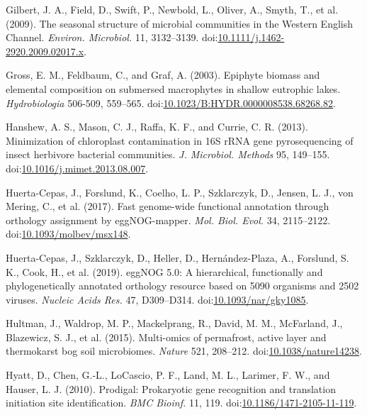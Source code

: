 \documentclass[12pt,]{article}
\begin{document}
\leavevmode\hypertarget{ref-Gilbert2009}{}%
Gilbert, J. A., Field, D., Swift, P., Newbold, L., Oliver, A., Smyth,
T., et al. (2009). The seasonal structure of microbial communities in
the Western English Channel. \emph{Environ. Microbiol.} 11, 3132--3139.
doi:\href{https://doi.org/10.1111/j.1462-2920.2009.02017.x}{10.1111/j.1462-2920.2009.02017.x}.

\leavevmode\hypertarget{ref-Gross2003}{}%
Gross, E. M., Feldbaum, C., and Graf, A. (2003). Epiphyte biomass and
elemental composition on submersed macrophytes in shallow eutrophic
lakes. \emph{Hydrobiologia} 506-509, 559--565.
doi:\href{https://doi.org/10.1023/B:HYDR.0000008538.68268.82}{10.1023/B:HYDR.0000008538.68268.82}.

\leavevmode\hypertarget{ref-Hanshew2013}{}%
Hanshew, A. S., Mason, C. J., Raffa, K. F., and Currie, C. R. (2013).
Minimization of chloroplast contamination in 16S rRNA gene
pyrosequencing of insect herbivore bacterial communities. \emph{J.
Microbiol. Methods} 95, 149--155.
doi:\href{https://doi.org/10.1016/j.mimet.2013.08.007}{10.1016/j.mimet.2013.08.007}.

\leavevmode\hypertarget{ref-Huerta-Cepas2017}{}%
Huerta-Cepas, J., Forslund, K., Coelho, L. P., Szklarczyk, D., Jensen,
L. J., von Mering, C., et al. (2017). Fast genome-wide functional
annotation through orthology assignment by eggNOG-mapper. \emph{Mol.
Biol. Evol.} 34, 2115--2122.
doi:\href{https://doi.org/10.1093/molbev/msx148}{10.1093/molbev/msx148}.

\leavevmode\hypertarget{ref-Huerta-Cepas2019}{}%
Huerta-Cepas, J., Szklarczyk, D., Heller, D., Hernández-Plaza, A.,
Forslund, S. K., Cook, H., et al. (2019). eggNOG 5.0: A hierarchical,
functionally and phylogenetically annotated orthology resource based on
5090 organisms and 2502 viruses. \emph{Nucleic Acids Res.} 47,
D309--D314.
doi:\href{https://doi.org/10.1093/nar/gky1085}{10.1093/nar/gky1085}.

\leavevmode\hypertarget{ref-Hultman2015}{}%
Hultman, J., Waldrop, M. P., Mackelprang, R., David, M. M., McFarland,
J., Blazewicz, S. J., et al. (2015). Multi-omics of permafrost, active
layer and thermokarst bog soil microbiomes. \emph{Nature} 521, 208--212.
doi:\href{https://doi.org/10.1038/nature14238}{10.1038/nature14238}.

\leavevmode\hypertarget{ref-Hyatt2010}{}%
Hyatt, D., Chen, G.-L., LoCascio, P. F., Land, M. L., Larimer, F. W.,
and Hauser, L. J. (2010). Prodigal: Prokaryotic gene recognition and
translation initiation site identification. \emph{BMC Bioinf.} 11, 119.
doi:\href{https://doi.org/10.1186/1471-2105-11-119}{10.1186/1471-2105-11-119}.
\end{document}
